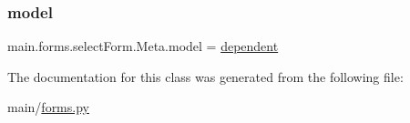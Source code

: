 \subsubsection{\texorpdfstring{model}{model}}
{\footnotesize\ttfamily main.\+forms.\+select\+Form.\+Meta.\+model = \hyperlink{classmain_1_1models_1_1dependent}{dependent}\hspace{0.3cm}{\ttfamily [static]}}



The documentation for this class was generated from the following file\+:\begin{DoxyCompactItemize}
\item 
main/\hyperlink{forms_8py}{forms.\+py}\end{DoxyCompactItemize}
